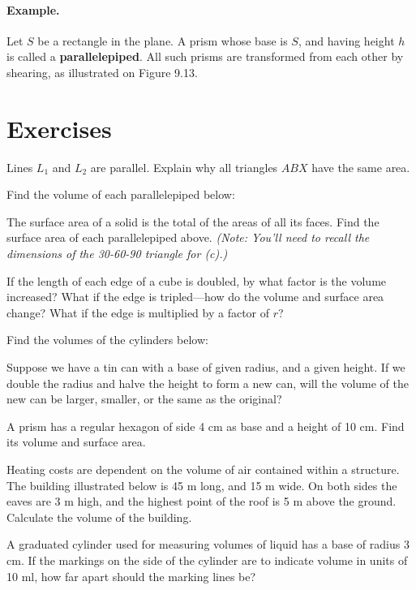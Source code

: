 \documentclass[12pt]{book} %
\begin{document}

\paragraph{Example.}
Let $S$ be a rectangle in the plane. A prism whose base is $S$, and having height $h$ is called a \textbf{parallelepiped}. All such prisms are transformed from each other by shearing, as illustrated on Figure 9.13.


\section*{Exercises}

\setcounter{Exercise}{0}
\begin{ExerciseList}
\Exercise Lines $L_1$ and $L_2$ are parallel. Explain why all triangles $ABX$ have the same area.


\Exercise Find the volume of each parallelepiped below:


\Exercise The surface area of a solid is the total of the areas of all its faces. Find the surface area of each parallelepiped above. \textit{(Note: You'll need to recall the dimensions of the 30-60-90 triangle for (c).)}

\Exercise If the length of each edge of a cube is doubled, by what factor is the volume increased? What if the edge is tripled---how do the volume and surface area change? What if the edge is multiplied by a factor of $r$?

\Exercise Find the volumes of the cylinders below:


\Exercise Suppose we have a tin can with a base of given radius, and a given height. If we double the radius and halve the height to form a new can, will the volume of the new can be larger, smaller, or the same as the original?

\Exercise A prism has a regular hexagon of side 4 cm as base and a height of 10 cm. Find its volume and surface area.

\Exercise Heating costs are dependent on the volume of air contained within a structure. The building illustrated below is 45 m long, and 15 m wide. On both sides the eaves are 3 m high, and the highest point of the roof is 5 m above the ground. Calculate the volume of the building.


\Exercise A graduated cylinder used for measuring volumes of liquid has a base of radius 3 cm. If the markings on the side of the cylinder are to indicate volume in units of 10 ml, how far apart should the marking lines be?

\end{ExerciseList}
\end{document}
